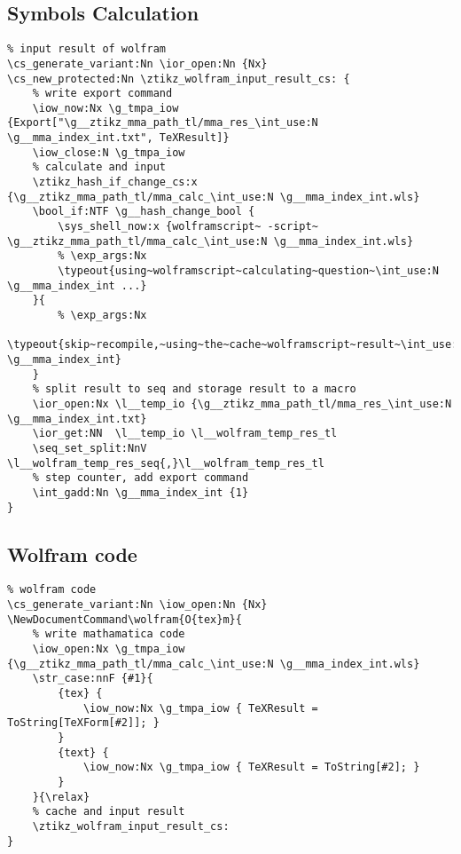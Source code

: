 \subsection{Symbols Calculation}
\begin{verbatim}
% input result of wolfram
\cs_generate_variant:Nn \ior_open:Nn {Nx}
\cs_new_protected:Nn \ztikz_wolfram_input_result_cs: {
    % write export command
    \iow_now:Nx \g_tmpa_iow {Export["\g__ztikz_mma_path_tl/mma_res_\int_use:N \g__mma_index_int.txt", TeXResult]}
    \iow_close:N \g_tmpa_iow
    % calculate and input
    \ztikz_hash_if_change_cs:x {\g__ztikz_mma_path_tl/mma_calc_\int_use:N \g__mma_index_int.wls}   
    \bool_if:NTF \g__hash_change_bool {
        \sys_shell_now:x {wolframscript~ -script~ \g__ztikz_mma_path_tl/mma_calc_\int_use:N \g__mma_index_int.wls}
        % \exp_args:Nx 
        \typeout{using~wolframscript~calculating~question~\int_use:N \g__mma_index_int ...}
    }{
        % \exp_args:Nx 
        \typeout{skip~recompile,~using~the~cache~wolframscript~result~\int_use:N \g__mma_index_int}
    }
    % split result to seq and storage result to a macro
    \ior_open:Nx \l__temp_io {\g__ztikz_mma_path_tl/mma_res_\int_use:N \g__mma_index_int.txt}
    \ior_get:NN  \l__temp_io \l__wolfram_temp_res_tl
    \seq_set_split:NnV \l__wolfram_temp_res_seq{,}\l__wolfram_temp_res_tl
    % step counter, add export command
    \int_gadd:Nn \g__mma_index_int {1}  
}
\end{verbatim}

\subsection{Wolfram code}
\begin{verbatim}
% wolfram code
\cs_generate_variant:Nn \iow_open:Nn {Nx}
\NewDocumentCommand\wolfram{O{tex}m}{
    % write mathamatica code
    \iow_open:Nx \g_tmpa_iow {\g__ztikz_mma_path_tl/mma_calc_\int_use:N \g__mma_index_int.wls}
    \str_case:nnF {#1}{
        {tex} {
            \iow_now:Nx \g_tmpa_iow { TeXResult = ToString[TeXForm[#2]]; }
        }
        {text} {
            \iow_now:Nx \g_tmpa_iow { TeXResult = ToString[#2]; }
        }
    }{\relax}
    % cache and input result
    \ztikz_wolfram_input_result_cs:
}
\end{verbatim}

